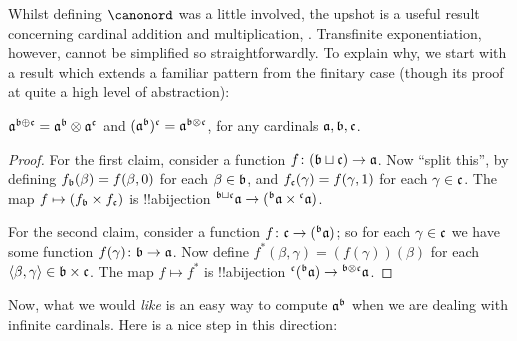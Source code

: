 \documentclass[../../../include/open-logic-section]{subfiles}
\begin{document}


Whilst defining $\canonord$ was a little involved, the upshot is a
useful result concerning cardinal addition and multiplication,
. Transfinite exponentiation, however,
cannot be simplified so straightforwardly. To explain why, we start
with a result which extends a familiar pattern from the finitary case
(though its proof  at quite a high level of abstraction):

\begin{prop}
$\mathfrak{a}^{\mathfrak{b} \oplus \mathfrak{c}} =
\mathfrak{a}^{\mathfrak{b}} \otimes
\mathfrak{a}^{\mathfrak{c}}$ and
$(\mathfrak{a}^{\mathfrak{b}})^{\mathfrak{c}} =
\mathfrak{a}^{\mathfrak{b} \otimes \mathfrak{c}}$, for
any cardinals $\mathfrak{a}, \mathfrak{b}, \mathfrak{c}$.
\end{prop}

\begin{proof}
For the first claim, consider a function $f \colon
(\mathfrak{b}\sqcup\mathfrak{c}) \to \mathfrak{a}$. Now ``split
this'', by defining $f_{\mathfrak{b}}(\beta) = f(\beta, 0)$ for each
$\beta \in \mathfrak{b}$, and $f_{\mathfrak{c}}(\gamma) = f(\gamma, 1)$
for each $\gamma \in \mathfrak{c}$. The map $f \mapsto
(f_{\mathfrak{b}} \times f_{\mathfrak{c}})$ is !!a{bijection}
${}^{\mathfrak{b} \sqcup \mathfrak{c}}{\mathfrak{a}} \to
({}^{\mathfrak{b}}{\mathfrak{a}} \times
{}^{\mathfrak{c}}{\mathfrak{a}})$. 

For the second claim, consider a function $f \colon \mathfrak{c} \to
({}^{\mathfrak{b}}{\mathfrak{a}})$; so for each $\gamma \in
\mathfrak{c}$ we have some function $f(\gamma) \colon \mathfrak{b} \to
\mathfrak{a}$. Now define $f^*(\beta, \gamma) = (f(\gamma))(\beta)$
for each $\langle \beta, \gamma \rangle \in \mathfrak{b} \times \mathfrak{c}$.
The map $f \mapsto f^*$ is !!a{bijection}
${}^{\mathfrak{c}}{({}^{\mathfrak{b}}{\mathfrak{a}})}
\to {}^{\mathfrak{b} \otimes \mathfrak{c}}{\mathfrak{a}}$. 
\end{proof}

Now, what we would \emph{like} is an easy way to compute
$\mathfrak{a}^{\mathfrak{b}}$ when we are dealing with
infinite cardinals. Here is a nice step in this direction:
\end{document}
